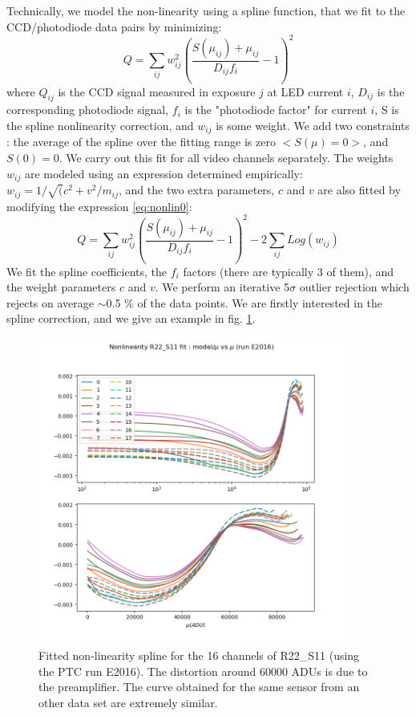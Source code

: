 Technically, we model the non-linearity using a spline function, that we fit to the CCD/photodiode data pairs by minimizing:
\begin{equation}
Q = \sum_{ij} w_{ij}^2 \left( \frac{ S(\mu_{ij}) +\mu_{ij}  }{D_{ij} f_i} -1 \right)^2
\label{eq:nonlin0}
\end{equation}
where $Q_{ij}$ is the CCD signal measured in exposure $j$ at LED current $i$,
$D_{ij}$ is the corresponding photodiode signal, $f_i$ is the "photodiode factor" for current $i$, S is the spline nonlinearity correction, and $w_{ij}$ is some weight. We add two constraints : the average of the spline over the fitting range is zero $<S(\mu)=0>$, and $S(0) = 0$. We carry out this fit for all video channels separately. The weights $w_{ij}$ are modeled using an expression determined empirically: $w_{ij} = 1/\sqrt(c^2+v^2/m_{ij}$, and the two extra parameters, $c$ and $v$ are also fitted by modifying the expression \ref{eq:nonlin0}:
\begin{equation}
Q = \sum_{ij} w_{ij}^2 \left( \frac{ S(\mu_{ij}) +\mu_{ij}  }{D_{ij} f_i} -1 \right)^2 - 2 \sum_{ij} Log(w_{ij})
\label{eq:nonlin1}
\end{equation}
We fit the spline coefficients, the $f_i$ factors (there are typically 3 of them), and the weight parameters $c$ and $v$. We perform an iterative 5$\sigma$ outlier rejection which rejects on average $\sim $0.5 \% of the data points.  
We are firstly interested in the spline correction, and we give an example in fig. \ref{fig:nonlin_model}.
\begin{figure}
\begin{centering}
\includegraphics[width=0.9\textwidth]{sections/figures/E2016_nonlin_model.png}
\end{centering}
\caption{Fitted non-linearity spline for the 16 channels of R22\_S11 (using the PTC run E2016). The distortion around 60000 ADUs is due to the preamplifier. The curve obtained for the same sensor from an other data set are extremely similar. \label{fig:nonlin_model}}


\end{figure}




